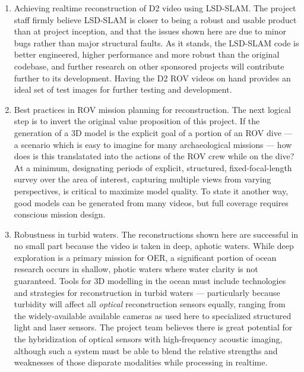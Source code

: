 \documentclass[letterpaper,12pt]{article}
\begin{document}
\begin{enumerate}
    \item Achieving realtime reconstruction of D2 video using LSD-SLAM.   The project staff firmly believe LSD-SLAM is closer to being a robust and usable product than at project inception, and that the issues shown here are due to minor bugs rather than major structural faults.   As it stands, the LSD-SLAM code is better engineered, higher performance and more robust than the original codebase, and further research on other sponsored projects will contribute further to its development.   Having the D2 ROV videos on hand provides an ideal set of test images for further testing and development.
    
    \item Best practices in ROV mission planning for reconstruction.   The next logical step is to invert the original value proposition of this project.   If the generation of a 3D model is the explicit goal of a portion of an ROV dive --- a scenario which is easy to imagine for many archaeological missions --- how does is this translatated into the actions of the ROV crew while on the dive?   At a minimum, designating periods of explicit, structured, fixed-focal-length survey over the area of interest, capturing multiple views from varying perspectives, is critical to maximize model quality.  To state it another way, good models can be generated from many videos, but full coverage requires conscious mission design.
    
    \item Robustness in turbid waters.  The reconstructions shown here are successful in no small part because the video is taken in deep, aphotic waters.   While deep exploration is a primary mission for OER, a significant portion of ocean research occurs in shallow, photic waters where water clarity is not guaranteed.   Tools for 3D modelling in the ocean must include technologies and strategies for reconstruction in turbid waters --- particularly because turbidity will affect all \textit{optical} reconstruction sensors equally, ranging from the widely-available available cameras as used here to specialized structured light and laser sensors.   The project team believes there is great potential for the hybridization of optical sensors with high-frequency acoustic imaging, although such a system must be able to blend the relative strengths and weaknesses of those disparate modalities while processing in realtime. 
\end{enumerate}
\end{document}
